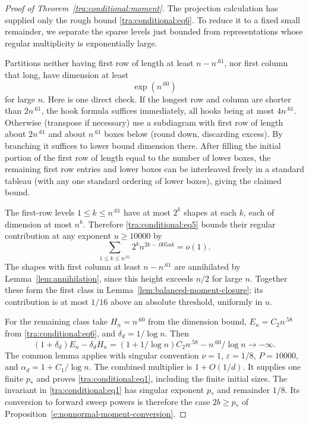 \begin{proof}[Proof of Theorem~\ref{tra:conditional:moment}]
The projection calculation has supplied only the rough bound
\eqref{tra:conditional:eq6}. To reduce it to a fixed small remainder,
we separate the sparse levels just bounded from representations whose
regular multiplicity is exponentially large.

Partitions neither having first row of length at least \(n-n^{.61}\), nor first column that long, have dimension at least
\[
                                \exp(n^{.60})
\]
for large \(n\). Here is one direct check. If the longest row and column are shorter than \(2n^{.61}\), the hook formula suffices immediately, all hooks being at most \(4n^{.61}\). Otherwise (transpose if necessary) use a subdiagram with first row of length about \(2n^{.61}\) and about \(n^{.61}\) boxes below (round down, discarding excess). By branching it suffices to lower bound dimension there. After filling the initial portion of the first row of length equal to the number of lower boxes, the remaining first row entries and lower boxes can be interleaved freely in a standard tableau (with any one standard ordering of lower boxes), giving the claimed bound.

The first-row levels $1\le k\le n^{.61}$ have at most $2^k$
shapes at each $k$, each of dimension at most $n^k$. Therefore
\eqref{tra:conditional:eq5} bounds their regular contribution at
any exponent $u\ge10000$ by
\[
 \sum_{1\le k\le n^{.61}}2^k n^{2k-.005uk}=o(1).
\]
The shapes with first column at least $n-n^{.61}$ are annihilated
by Lemma~\ref{lem:annihilation}, since this height exceeds $n/2$
for large $n$. Together these form the first class in
Lemma~\ref{lem:balanced-moment-closure}; its contribution is at most
$1/16$ above an absolute threshold, uniformly in $u$.

For the remaining class take $H_n=n^{.60}$ from the dimension bound,
$E_n=C_2n^{.58}$ from \eqref{tra:conditional:eq6}, and
$\delta_d=1/\log n$. Then
\[
 (1+\delta_d)E_n-\delta_dH_n
 =(1+1/\log n)C_2n^{.58}-n^{.60}/\log n\longrightarrow-\infty.
\]
The common lemma applies with singular convention $\nu=1$,
$\varepsilon=1/8$, $P=10000$, and
$\alpha_d=1+C_1/\log n$. The combined multiplier is
$1+O(1/d)$. It supplies one finite $p_*$ and proves
\eqref{tra:conditional:eq1}, including the finite initial sizes.
\label{tra:conditional:fourier-completion}
The invariant in \eqref{tra:conditional:eq1} has singular exponent
$p_*$ and remainder $1/8$. Its conversion to forward sweep powers is
therefore the case $2b\ge p_*$ of
Proposition~\ref{e:nonnormal-moment-conversion}.
\end{proof}
